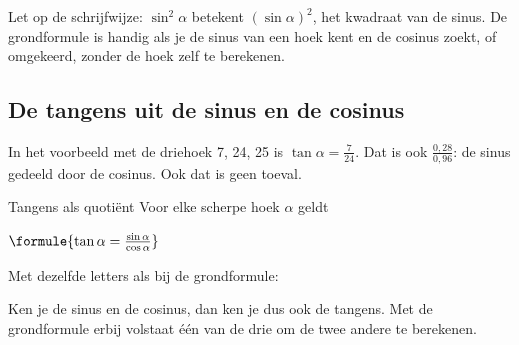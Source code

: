 Let op de schrijfwijze: $\sin^2\alpha$ betekent $(\sin\alpha)^2$, het kwadraat van de sinus. De grondformule is handig als je de sinus van een hoek kent en de cosinus zoekt, of omgekeerd, zonder de hoek zelf te berekenen.


\begin{oefeningen}
\end{oefeningen}

\subsection{De tangens uit de sinus en de cosinus}

In het voorbeeld met de driehoek 7, 24, 25 is $\tan\alpha = \tfrac{7}{24}$. Dat is ook $\tfrac{0{,}28}{0{,}96}$: de sinus gedeeld door de cosinus. Ook dat is geen toeval.

\begin{theorie}
\begin{stelling}{Tangens als quotiënt}
Voor elke scherpe hoek $\alpha$ geldt

\vspace{1mm}
\qquad $\formule{\tan\alpha = \frac{\sin\alpha}{\cos\alpha}}$
\end{stelling}

\begin{bewijs}
Met dezelfde letters als bij de grondformule:
\end{bewijs}
\end{theorie}

Ken je de sinus en de cosinus, dan ken je dus ook de tangens. Met de grondformule erbij volstaat één van de drie om de twee andere te berekenen.

